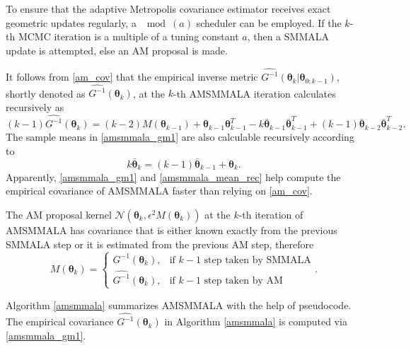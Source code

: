 \documentclass[twoside,11pt]{article}
\begin{document}
To ensure that the adaptive Metropolis covariance estimator receives exact geometric updates regularly, a $\mod{(a)}$ 
scheduler can be employed. If the $k$-th MCMC iteration is a multiple of a tuning constant $a$, then a SMMALA update is 
attempted, else an AM proposal is made.

It follows from \eqref{am_cov} that the empirical inverse metric
$\widehat{G^{-1}}(\boldsymbol{\theta}_{k}|\boldsymbol{\theta}_{0:k-1})$, shortly denoted as
$\widehat{G^{-1}}(\boldsymbol{\theta}_{k})$, at the $k$-th AMSMMALA iteration calculates recursively as
\begin{equation}
\label{amsmmala_gm1}
(k-1)\widehat{G^{-1}}(\boldsymbol{\theta}_{k})=
(k-2)M(\boldsymbol{\theta}_{k-1})+
\boldsymbol{\theta}_{k-1} \boldsymbol{\theta}_{k-1}^{T}-
k\bar{\boldsymbol{\theta}}_{k-1} \bar{\boldsymbol{\theta}}_{k-1}^{T}+
(k-1)\bar{\boldsymbol{\theta}}_{k-2} \bar{\boldsymbol{\theta}}_{k-2}^{T}.
\end{equation}
The sample means in \eqref{amsmmala_gm1} are also calculable recursively according to
\begin{equation}
\label{amsmmala_mean_rec}
k\bar{\boldsymbol{\theta}}_k=(k-1)\bar{\boldsymbol{\theta}}_{k-1}+\boldsymbol{\theta}_k.
\end{equation}
Apparently, \eqref{amsmmala_gm1} and \eqref{amsmmala_mean_rec} help compute the empirical covariance of AMSMMALA faster than 
relying on \eqref{am_cov}.

The AM proposal kernel $\mathcal{N}(\boldsymbol{\theta}_{k}, \epsilon^2M(\boldsymbol{\theta}_{k}))$ at the 
$k$-th iteration of AMSMMALA has covariance that is either known exactly from the previous 
SMMALA step or it is estimated from the previous AM step, therefore
\begin{equation}
M(\boldsymbol{\theta}_{k})=
\left\{
\begin{array}{ll}
G^{-1}(\boldsymbol{\theta}_k), & \mbox{if $k-1$ step taken by SMMALA}\\
\widehat{G^{-1}}(\boldsymbol{\theta}_{k}), & \mbox{if $k-1$ step taken by AM}
\end{array}.
\right.
\end{equation}

Algorithm \ref{amsmmala} summarizes AMSMMALA with the help of pseudocode. The empirical covariance 
$\widehat{G^{-1}}(\boldsymbol{\theta}_{k})$ in Algorithm \ref{amsmmala} is computed via \eqref{amsmmala_gm1}.
\end{document}
